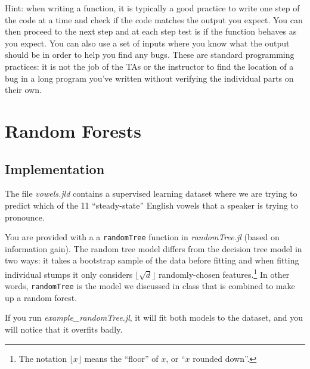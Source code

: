 \documentclass{article}
\begin{document}
Hint: when writing a function, it is typically a good practice to write one step of the code at a time and check if the code matches the output you expect. You can then proceed to the next step and at each step test is if the function behaves as you expect. You can also use a set of inputs where you know what the output should be in order to help you find any bugs. These are standard programming practices: it is not the job of the TAs or the instructor to find the location of a bug in a long program you've written without verifying the individual parts on their own.


\pagebreak

\section{Random Forests}


 \subsection{Implementation}

The file \emph{vowels.jld} contains a supervised learning dataset where we are trying to predict which of the 11 ``steady-state'' English vowels that a speaker is trying to pronounce.

You are provided with a a \texttt{randomTree} function in \emph{randomTree.jl} (based on information gain). The random tree model differs from the decision tree model in two ways:
it takes a bootstrap sample of the data before fitting and when fitting individual stumps it only considers $\lfloor \sqrt{d} \rfloor$ randomly-chosen features.\footnote{The notation $\lfloor x\rfloor$ means the ``floor'' of $x$, or ``$x$ rounded down''.}
In other words, \texttt{randomTree} is the model we discussed in class that is combined to make up a random forest.

If you run \emph{example\_randomTree.jl}, it will fit both models to the dataset, and you will notice that it overfits badly.
\end{document}
